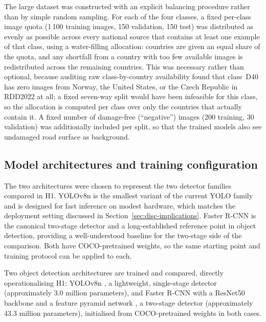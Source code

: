 \documentclass[10pt,a4paper,twocolumn]{article}
\begin{document}
The large dataset was constructed with an explicit balancing procedure
rather than by simple random sampling. For each of the four classes, a
fixed per-class image quota (1\,100 training images, 150 validation, 150
test) was distributed as evenly as possible across every national source
that contains at least one example of that class, using a water-filling
allocation: countries are given an equal share of the quota, and any
shortfall from a country with too few available images is redistributed
across the remaining countries. This was necessary rather than optional,
because auditing raw class-by-country availability found that class~D40
has zero images from Norway, the United States, or the Czech Republic in
RDD2022 at all; a fixed seven-way split would have been infeasible for
this class, so the allocation is computed per class over only the
countries that actually contain it. A fixed number of damage-free
(``negative'') images (200 training, 30 validation) was additionally
included per split, so that the trained models also see undamaged road
surface as background.

\subsection{Model architectures and training configuration}
\label{sec:method-models}

The two architectures were chosen to represent the two detector families
compared in H1. YOLOv8n is the smallest variant of the current YOLO family
and is designed for fast inference on modest hardware, which matches the
deployment setting discussed in Section~\ref{sec:disc-implications}. Faster
R-CNN is the canonical two-stage detector and a long-established reference
point in object detection, providing a well-understood baseline for the
two-stage side of the comparison. Both have COCO-pretrained weights, so the
same starting point and training protocol can be applied to each.

Two object detection architectures are trained and compared, directly
operationalising H1: YOLOv8n \citep{jocher2023ultralytics}, a
lightweight, single-stage detector (approximately 3.0 million
parameters), and Faster R-CNN with a ResNet50 backbone and a feature
pyramid network \citep{ren2015fasterrcnn}, a two-stage detector
(approximately 43.3 million parameters), initialised from COCO-pretrained
weights in both cases.
\end{document}
